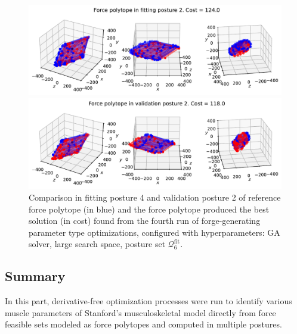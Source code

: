 \begin{figure}[!htb]
    \centering
    \captionsetup{justification=centering}
    
    \begin{minipage}{0.8\linewidth}
        \captionsetup{justification=centering}
        \centering
        \includegraphics[trim={0 0 0 0}, clip, width=1\linewidth]{img/chapter_4/reconstruction_stanford_imgs/polytope_genetic_p6_force_small_output_3215117_trial_4_fitting_posture_2_with_stanford.pdf}
    \end{minipage}
    \begin{minipage}{0.8\linewidth}
        \captionsetup{justification=centering}
        \centering
        \includegraphics[trim={0 0 0 0}, clip, width=1\linewidth]{img/chapter_4/reconstruction_stanford_imgs/polytope_genetic_p6_force_small_output_3215117_trial_4_val_posture_2_with_stanford.pdf}
    \end{minipage}
    \caption{Comparison in fitting posture 4 and validation posture 2 of reference force polytope (in blue) and the force polytope produced the best solution (in cost) found from the fourth run of forge-generating parameter type optimizations, configured with hyperparameters: GA solver, large search space, posture set $\mathcal{Q}_6^{\text{fit}}$.}
    \label{fig:polytope_genetic_p6_force_small_output_3215117_trial_4_fitting_posture_2}
\end{figure}


\subsection{Summary}
In this part, derivative-free optimization processes were run to identify various muscle parameters of Stanford's musculoskeletal model directly from force feasible sets modeled as force polytopes and computed in multiple postures. 

